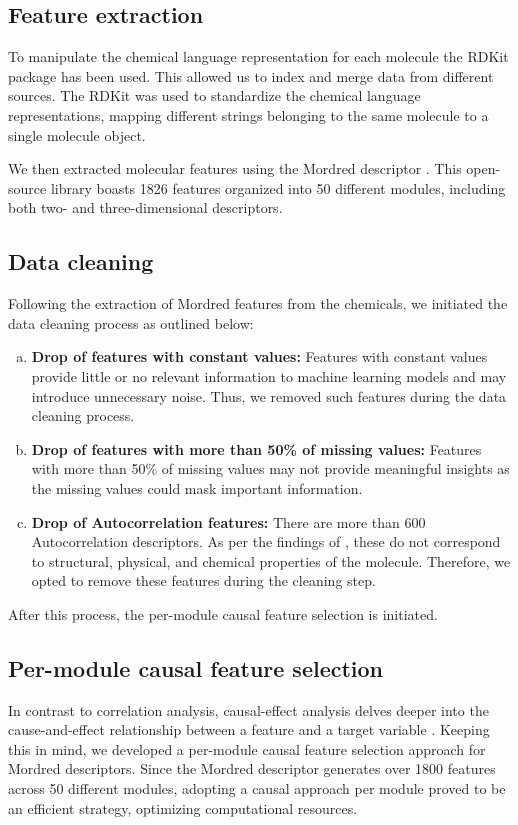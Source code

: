 \documentclass{article}
\begin{document}
\subsection{Feature extraction}

To manipulate the chemical language representation for each molecule the RDKit \cite{landrum2013rdkit} package has been used. This allowed us to index and merge data from different sources. The RDKit was used to standardize the chemical language representations, mapping different strings belonging to the same molecule to a single molecule object.  

We then extracted molecular features using the Mordred descriptor \cite{moriwaki2018mordred}. This open-source library boasts 1826 features organized into 50 different modules, including both two- and three-dimensional descriptors.

\subsection{Data cleaning}

Following the extraction of Mordred features from the chemicals, we initiated the data cleaning process as outlined below:

\begin{enumerate}[a)]
    \item \textbf{Drop of features with constant values:} Features with constant values provide little or no relevant information to machine learning models and may introduce unnecessary noise. Thus, we removed such features during the data cleaning process.
    
    \item \textbf{Drop of features with more than 50\% of missing values:} Features with more than 50\% of missing values may not provide meaningful insights as the missing values could mask important information. 
    
    \item \textbf{Drop of Autocorrelation features:} There are more than 600 Autocorrelation descriptors. As per the findings of \cite{hollas2003analysis}, these do not correspond to structural, physical, and chemical properties of the molecule. Therefore, we opted to remove these features during the cleaning step.
\end{enumerate}

After this process, the per-module causal feature selection is initiated.

\subsection{Per-module causal feature selection}
In contrast to correlation analysis, causal-effect analysis delves deeper into the cause-and-effect relationship between a feature and a target variable \cite{guyon2007causal}. Keeping this in mind, we developed a per-module causal feature selection approach for Mordred descriptors. Since the Mordred descriptor generates over 1800 features across 50 different modules, adopting a causal approach per module proved to be an efficient strategy, optimizing computational resources.
\end{document}
